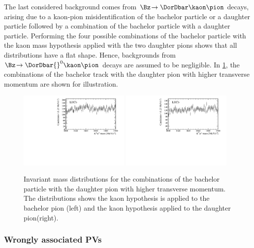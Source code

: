 The last considered background comes from $\Bz\!\to\DorDbar\kaon\pion$ decays, arising due to a kaon-pion misidentification of the bachelor particle or a \Dm daughter particle followed by a combination of the bachelor particle with a \Dm daughter particle.
Performing the four possible combinations of the bachelor particle with the kaon mass hypothesis applied with the two \Dm daughter pions shows that all distributions have a flat shape.
Hence, backgrounds from $\Bz\!\to\DorDbar{}^0\kaon\pion$ decays are assumed to be negligible.
In \cref{fig:DzVeto}, the combinations of the bachelor track with the \Dm daughter pion with higher transverse momentum are shown for illustration.
\begin{figure}[tbp]
    \centering
    \includegraphics[width=0.48\textwidth]{07selection/figs/D0Hypo3.pdf}
    \includegraphics[width=0.48\textwidth]{07selection/figs/D0Hypo4.pdf}
    \caption{Invariant mass distributions for the combinations of the bachelor particle with the \Dm daughter pion with higher transverse momentum.
    The distributions shows the kaon hypothesis is applied to the bachelor pion (left) and the kaon hypothesis applied to the \Dm daughter pion(right).}
    \label{fig:DzVeto}
\end{figure}

\subsubsection*{Wrongly associated PVs}

